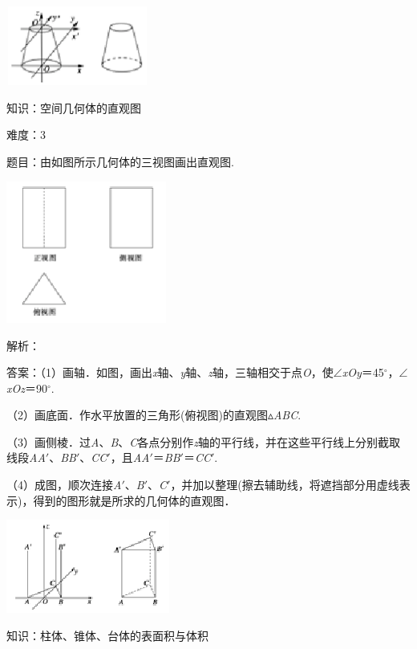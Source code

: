 \documentclass{article} %
\begin{document}
\includegraphics*[width=1.84in, height=1.02in, keepaspectratio=false]{image61}


知识：空间几何体的直观图

难度：3

题目：由如图所示几何体的三视图画出直观图.

\includegraphics*[width=2.07in, height=1.84in, keepaspectratio=false]{image62}

解析：

答案：（1）画轴．如图，画出\textit{x}轴、\textit{y}轴、\textit{z}轴，三轴相交于点\textit{O}，使$\mathrm{\angle}$\textit{xOy}＝45$\mathrm{{}^\circ}$，$\mathrm{\angle}$\textit{xOz}＝90$\mathrm{{}^\circ}$.

（2）画底面．作水平放置的三角形(俯视图)的直观图$\mathrm{\vartriangle}$\textit{ABC}.

（3）画侧棱．过\textit{A}、\textit{B}、\textit{C}各点分别作\textit{z}轴的平行线，并在这些平行线上分别截取线段\textit{AA}$'$、\textit{BB}$'$、\textit{CC}$'$，且\textit{AA}$'$＝\textit{BB}$'$＝\textit{CC}$'$.

（4）成图，顺次连接\textit{A}$'$、\textit{B}$'$、\textit{C}$'$，并加以整理(擦去辅助线，将遮挡部分用虚线表示)，得到的图形就是所求的几何体的直观图．

\includegraphics*[width=2.11in, height=1.21in, keepaspectratio=false]{image63}




知识：柱体、锥体、台体的表面积与体积
\end{document}

